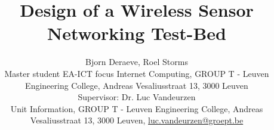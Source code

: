 \documentclass[a4paper]{article}
\begin{document}
\title{Design of a Wireless Sensor Networking Test-Bed}

\author{Bjorn Deraeve\supit{*}, Roel Storms\supit{*} \\ \vspace*{0.25cm}
            \small{\supit{*}Master student EA-ICT focus Internet Computing, GROUP T - Leuven Engineering College, Andreas Vesaliusstraat 13, 3000 Leuven \\ \vspace*{1.5cm}
            Supervisor: Dr. Luc Vandeurzen \\            
            Unit Information, GROUP T - Leuven Engineering College, Andreas Vesaliusstraat 13, 3000 Leuven, \href{mailto:luc.vandeurzen@groept.be}{luc.vandeurzen@groept.be}} \\ \vspace*{1em}
            }
  

\pagebreak  




\end{document}
